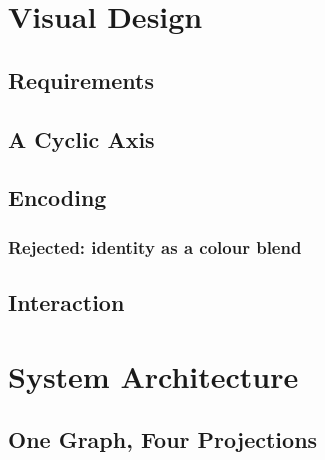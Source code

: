 \documentclass[10pt,a4paper]{article}
\newif\ifshowguides
\newcommand{\guide}[1]{%
  \ifshowguides
    {\par\smallskip\footnotesize\color{guidecol}%
     \textbf{[guide]}~#1\par\smallskip}%
  \fi}
\begin{document}
\section{Visual Design}
\label{sec:vis}

\subsection{Requirements}

\subsection{A Cyclic Axis}

\guide{This subsection carries the cylinder. The claim is that column
order follows the countermeasure loop --- Protocol $\to$ Band $\to$
Modulation $\to$ Antenna $\to$ Propagation $\to$ Noise $\to$ Attack
$\to$ Objective $\to$ Mitigation $\to$ Limitation $\to$ Use-case $\to$
Protocol --- so the axis genuinely has no first element and a closed
surface is the honest projection. If that ordering cannot be defended,
the honest fallback is a flat matrix, and the paper is built so losing
this argument costs one subsection rather than the contribution. Keep
that property as you write.}

\subsection{Encoding}

\subsubsection{Rejected: identity as a colour blend}

\subsection{Interaction}

\section{System Architecture}

\subsection{One Graph, Four Projections}
\end{document}
